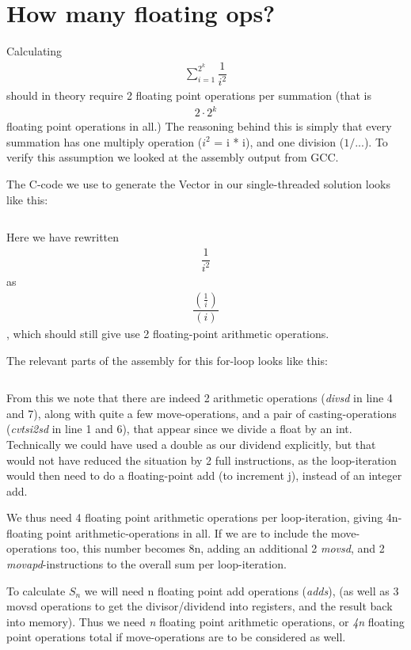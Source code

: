 \section{How many floating ops?}

Calculating \begin{align*}\sum_{i=1}^{2^k}\dfrac{1}{i^2}\end{align*} should in theory require 2 floating
point operations per summation (that is 
\begin{align*}2\cdot 2^k
\end{align*} 
floating point operations in all.)
The reasoning behind this is simply that every summation has one multiply operation ($i^2$ = i * i), and one division
($1/...$). To verify this assumption we looked at the assembly output from GCC.

The C-code we use to generate the Vector in our single-threaded solution
looks like this:
\inputminted[tabsize=4]{c}{CreateVector.c}

Here we have rewritten \begin{align*}\dfrac{1}{i^2}\end{align*} as \begin{align*}\dfrac{\left(\frac{1}{i}\right)}{(i)}\end{align*}, which
should still give use 2 floating-point arithmetic operations.

The relevant parts of the assembly for this for-loop looks like this:

\inputminted[linenos]{gas}{SingleThread.s}

From this we note that there are indeed 2 arithmetic operations (\textit{divsd} in line 4 and 7), along with quite a few move-operations,
and a pair of casting-operations (\textit{cvtsi2sd} in line 1 and 6), that appear since we divide a float by an int. Technically we could
have used a double as our dividend explicitly, but that would not have reduced the situation by 2 full instructions,
as the loop-iteration would then need to do a floating-point add (to increment j), instead of an integer add.

We thus need 4 floating point arithmetic operations per loop-iteration, giving 4n-floating point arithmetic-operations in all. If we are to include the move-operations too, this number becomes 8n, adding an additional 2 \textit{movsd},
and 2 \textit{movapd}-instructions to the overall sum per loop-iteration.

To calculate $S_n$ we will need n floating point add operations (\textit{adds}), (as well as 3 movsd operations to get the divisor/dividend
into registers, and the result back into memory). Thus we need \textit{n} floating point arithmetic operations, or \textit{4n} floating point
operations total if move-operations are to be considered as well.

